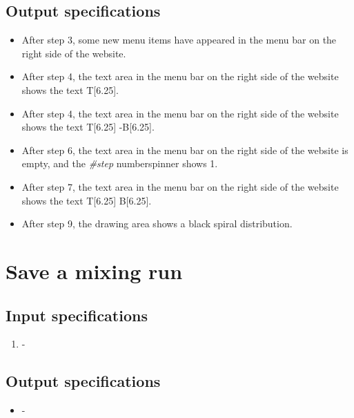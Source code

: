 \subsection*{Output specifications}
\begin{itemize}
\item After step 3, some new menu items have appeared in the menu bar on the right side of the website.
\item After step 4, the text area in the menu bar on the right side of the website shows the text T[6.25].
\item After step 4, the text area in the menu bar on the right side of the website shows the text T[6.25] -B[6.25].
\item After step 6, the text area in the menu bar on the right side of the website is empty, and the \emph{#step} numberspinner shows 1.
\item After step 7, the text area in the menu bar on the right side of the website shows the text T[6.25] B[6.25].
\item After step 9, the drawing area shows a black spiral distribution.
\end{itemize}

\section{Save a mixing run}

\subsection*{Input specifications}
\begin{enumerate}
\item -
\end{enumerate}

\subsection*{Output specifications}
\begin{itemize}
\item -
\end{itemize}